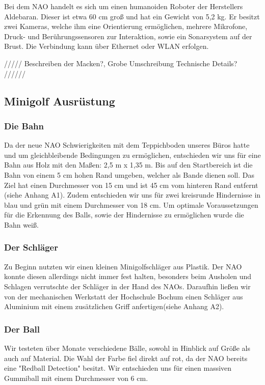 \documentclass{scrartcl}
\begin{document}
Bei dem NAO handelt es sich um einen humanoiden Roboter der Herstellers Aldebaran.
Dieser ist etwa 60 cm groß und hat ein Gewicht von 5,2 kg. Er besitzt zwei Kameras, welche ihm eine Orientierung ermöglichen,  mehrere Mikrofone, Druck- und Berührungssensoren zur Interaktion, sowie ein Sonarsystem auf der Brust. Die Verbindung kann über Ethernet oder WLAN erfolgen. 

///// Beschreiben der Macken?, Grobe Umschreibung Technische Details? //////

\subsection{Minigolf Ausrüstung}

\subsubsection{Die Bahn}
Da der neue NAO Schwierigkeiten mit dem Teppichboden unseres Büros hatte und um gleichbleibende Bedingungen zu ermöglichen, entschieden wir uns für eine Bahn aus Holz mit den Maßen: 2,5 m x 1,35 m. Bis auf den Startbereich ist die Bahn von einem 5 cm hohen Rand umgeben, welcher als Bande dienen soll. Das Ziel hat einen Durchmesser von 15 cm und ist 45 cm vom hinteren Rand entfernt (siehe Anhang A1). Zudem entschieden wir uns für zwei kreisrunde Hindernisse in blau und grün mit einem Durchmesser von 18 cm. Um  optimale Voraussetzungen für die Erkennung des Balls, sowie der Hindernisse zu ermöglichen wurde die Bahn weiß.

\subsubsection{Der Schläger}
Zu Beginn nutzten wir einen kleinen Minigolfschläger aus Plastik. Der NAO konnte diesen allerdings nicht  immer fest halten, besonders beim Ausholen und Schlagen verrutschte der Schläger in der Hand des NAOs. Daraufhin ließen wir von der mechanischen Werkstatt der Hochschule Bochum einen Schläger aus Aluminium mit einem zusätzlichen Griff anfertigen(siehe Anhang A2).

\subsubsection{Der Ball}
Wir testeten über Monate verschiedene Bälle, sowohl in Hinblick auf Größe als auch auf Material. Die Wahl der Farbe fiel direkt auf rot, da der NAO bereits eine "Redball Detection" besitzt. Wir entschieden uns für einen massiven Gummiball mit einem Durchmesser von 6 cm.  
\end{document}
